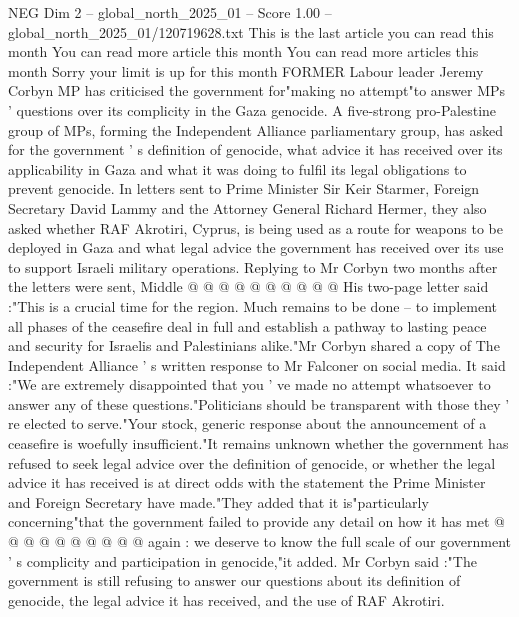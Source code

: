 \begin{textsample}{NEG Dim 2 – global\_north\_2025\_01 – Score 1.00 – global\_north\_2025\_01/120719628.txt}  \label{ex:f2_neg_086}
This is the last article you can read this month You can read more article this month You can read more articles this month Sorry your limit is up for this month FORMER Labour leader Jeremy Corbyn MP has criticised the government for"making no attempt"to answer MPs ' questions over its complicity in the Gaza genocide.
A five-strong pro-Palestine group of MPs, forming the Independent Alliance parliamentary group, has asked for the government ' s definition of genocide, what advice it has received over its applicability in Gaza and what it was doing to fulfil its legal obligations to prevent genocide.
In letters sent to Prime Minister Sir Keir Starmer, Foreign Secretary David Lammy and the Attorney General Richard Hermer, they also asked whether RAF Akrotiri, Cyprus, is being used as a route for weapons to be deployed in Gaza and what legal advice the government has received over its use to support Israeli military operations.
Replying to Mr Corbyn two months after the letters were sent, Middle @ @ @ @ @ @ @ @ @ @ His two-page letter said :"This is a crucial time for the region.
Much remains to be done -- to implement all phases of the ceasefire deal in full and establish a pathway to lasting peace and security for Israelis and Palestinians alike."Mr Corbyn shared a copy of The Independent Alliance ' s written response to Mr Falconer on social media.
It said :"We are extremely disappointed that you ' ve made no attempt whatsoever to answer any of these questions."Politicians should be transparent with those they ' re elected to serve."Your stock, generic response about the announcement of a ceasefire is woefully insufficient."It remains unknown whether the government has refused to seek legal advice over the definition of genocide, or whether the legal advice it has received is at direct odds with the statement the Prime Minister and Foreign Secretary have made."They added that it is"particularly concerning"that the government failed to provide any detail on how it has met @ @ @ @ @ @ @ @ @ @ again : we deserve to know the full scale of our government ' s complicity and participation in genocide,"it added.
Mr Corbyn said :"The government is still refusing to answer our questions about its definition of genocide, the legal advice it has received, and the use of RAF Akrotiri.

\end{textsample}
